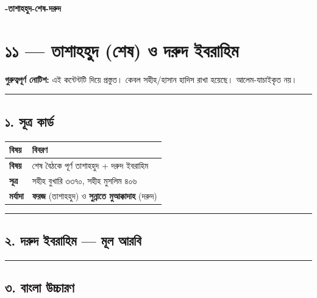

\begin{center}{\Large\bfseries\color{emerald} -তাশাহহুদ-শেষ-দরুদ}\end{center}
\vspace{1em}
\section*{১১ — তাশাহহুদ (শেষ) ও দরুদ ইবরাহিম}

\begin{warnbox}
 \textbf{গুরুত্বপূর্ণ নোটিশ:} এই কন্টেন্টটি  দিয়ে প্রস্তুত। কেবল সহীহ/হাসান হাদিস রাখা হয়েছে। আলেম-যাচাইকৃত নয়।
\end{warnbox}

\medskip\hrule\medskip

\subsection*{১. সূত্র কার্ড}

\begin{table}[h]\centering\small
\begin{tabular}{ll}
বিষয় & বিবরণ \\
\hline
\textbf{বিষয়} & শেষ বৈঠকে পূর্ণ তাশাহহুদ + দরুদ ইবরাহিম \\
\textbf{সূত্র} & সহীহ বুখারি ৩৩৭০, সহীহ মুসলিম ৪০৬ \\
\textbf{মর্যাদা} & \textbf{ফরজ} (তাশাহহুদ) ও \textbf{সুন্নাতে মুআক্কাদাহ} (দরুদ) \\
\hline
\end{tabular}
\end{table}

\medskip\hrule\medskip

\subsection*{২. দরুদ ইবরাহিম — মূল আরবি}

\begin{center}\end{center}

\medskip\hrule\medskip

\subsection*{৩. বাংলা উচ্চারণ}

